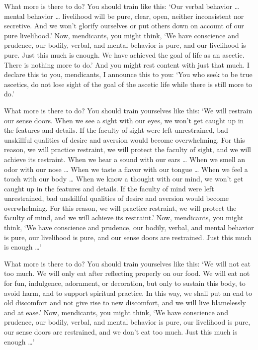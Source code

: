 \documentclass[12pt,openany]{book}%
\begin{document}
What more is there to do? You should train like this: ‘Our verbal behavior … mental behavior … livelihood will be pure, clear, open, neither inconsistent nor secretive. And we won’t glorify ourselves or put others down on account of our pure livelihood.’ Now, mendicants, you might think, ‘We have conscience and prudence, our bodily, verbal, and mental behavior is pure, and our livelihood is pure. Just this much is enough. We have achieved the goal of life as an ascetic. There is nothing more to do.’ And you might rest content with just that much. I declare this to you, mendicants, I announce this to you: ‘You who seek to be true ascetics, do not lose sight of the goal of the ascetic life while there is still more to do.’ 

What more is there to do? You should train yourselves like this: ‘We will restrain our sense doors. When we see a sight with our eyes, we won’t get caught up in the features and details. If the faculty of sight were left unrestrained, bad unskillful qualities of desire and aversion would become overwhelming. For this reason, we will practice restraint, we will protect the faculty of sight, and we will achieve its restraint. When we hear a sound with our ears … When we smell an odor with our nose … When we taste a flavor with our tongue … When we feel a touch with our body … When we know a thought with our mind, we won’t get caught up in the features and details. If the faculty of mind were left unrestrained, bad unskillful qualities of desire and aversion would become overwhelming. For this reason, we will practice restraint, we will protect the faculty of mind, and we will achieve its restraint.’ Now, mendicants, you might think, ‘We have conscience and prudence, our bodily, verbal, and mental behavior is pure, our livelihood is pure, and our sense doors are restrained. Just this much is enough …’ 

What more is there to do? You should train yourselves like this: ‘We will not eat too much. We will only eat after reflecting properly on our food. We will eat not for fun, indulgence, adornment, or decoration, but only to sustain this body, to avoid harm, and to support spiritual practice. In this way, we shall put an end to old discomfort and not give rise to new discomfort, and we will live blamelessly and at ease.’ Now, mendicants, you might think, ‘We have conscience and prudence, our bodily, verbal, and mental behavior is pure, our livelihood is pure, our sense doors are restrained, and we don’t eat too much. Just this much is enough …’ 
\end{document}

